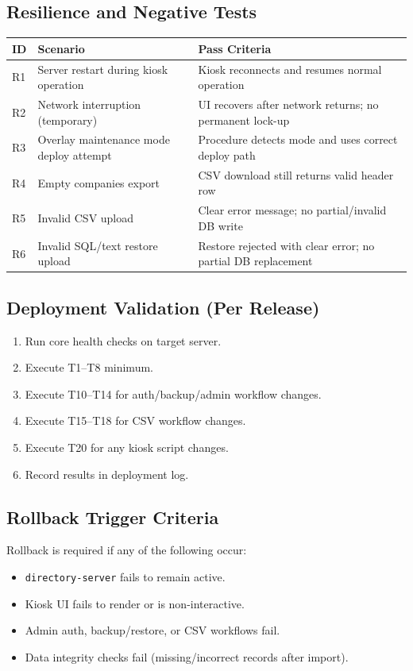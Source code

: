 \documentclass[11pt,letterpaper]{article}
\begin{document}
\subsection{Resilience and Negative Tests}

\begin{longtable}{p{0.6in} p{2.0in} p{3.3in}}
ID & Scenario & Pass Criteria \\
\hline
R1 & Server restart during kiosk operation & Kiosk reconnects and resumes normal operation \\
R2 & Network interruption (temporary) & UI recovers after network returns; no permanent lock-up \\
R3 & Overlay maintenance mode deploy attempt & Procedure detects mode and uses correct deploy path \\
R4 & Empty companies export & CSV download still returns valid header row \\
R5 & Invalid CSV upload & Clear error message; no partial/invalid DB write \\
R6 & Invalid SQL/text restore upload & Restore rejected with clear error; no partial DB replacement \\
\end{longtable}

\subsection{Deployment Validation (Per Release)}

\begin{enumerate}
\item Run core health checks on target server.
\item Execute T1--T8 minimum.
\item Execute T10--T14 for auth/backup/admin workflow changes.
\item Execute T15--T18 for CSV workflow changes.
\item Execute T20 for any kiosk script changes.
\item Record results in deployment log.
\end{enumerate}

\subsection{Rollback Trigger Criteria}

Rollback is required if any of the following occur:
\begin{itemize}
\item \texttt{directory-server} fails to remain active.
\item Kiosk UI fails to render or is non-interactive.
\item Admin auth, backup/restore, or CSV workflows fail.
\item Data integrity checks fail (missing/incorrect records after import).
\end{itemize}
\end{document}
